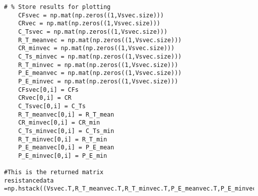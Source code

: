 \begin{lstlisting}[caption=Rewritten Python script based on the given MATLAB script (\autoref{Cost Hull}), label=oricalcosthull]
    # % Store results for plotting
    CFsvec = np.mat(np.zeros((1,Vsvec.size)))
    CRvec = np.mat(np.zeros((1,Vsvec.size)))
    C_Tsvec = np.mat(np.zeros((1,Vsvec.size)))
    R_T_meanvec = np.mat(np.zeros((1,Vsvec.size)))
    CR_minvec = np.mat(np.zeros((1,Vsvec.size)))
    C_Ts_minvec = np.mat(np.zeros((1,Vsvec.size)))
    R_T_minvec = np.mat(np.zeros((1,Vsvec.size)))
    P_E_meanvec = np.mat(np.zeros((1,Vsvec.size)))
    P_E_minvec = np.mat(np.zeros((1,Vsvec.size)))
    CFsvec[0,i] = CFs
    CRvec[0,i] = CR
    C_Tsvec[0,i] = C_Ts
    R_T_meanvec[0,i] = R_T_mean
    CR_minvec[0,i] = CR_min
    C_Ts_minvec[0,i] = C_Ts_min
    R_T_minvec[0,i] = R_T_min
    P_E_meanvec[0,i] = P_E_mean
    P_E_minvec[0,i] = P_E_min

#This is the returned matrix
resistancedata =np.hstack((Vsvec.T,R_T_meanvec.T,R_T_minvec.T,P_E_meanvec.T,P_E_minvec.T))   
\end{lstlisting}
